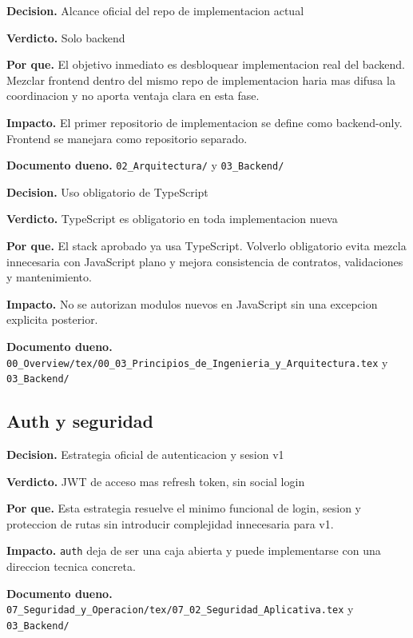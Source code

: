 \begin{docnote}
\textbf{Decision.} Alcance oficial del repo de implementacion actual

\textbf{Verdicto.} Solo backend

\textbf{Por que.} El objetivo inmediato es desbloquear implementacion real del backend. Mezclar frontend dentro del mismo repo de implementacion haria mas difusa la coordinacion y no aporta ventaja clara en esta fase.

\textbf{Impacto.} El primer repositorio de implementacion se define como backend-only. Frontend se manejara como repositorio separado.

\textbf{Documento dueno.} \texttt{02\_Arquitectura/} y \texttt{03\_Backend/}
\end{docnote}

\begin{docnote}
\textbf{Decision.} Uso obligatorio de TypeScript

\textbf{Verdicto.} TypeScript es obligatorio en toda implementacion nueva

\textbf{Por que.} El stack aprobado ya usa TypeScript. Volverlo obligatorio evita mezcla innecesaria con JavaScript plano y mejora consistencia de contratos, validaciones y mantenimiento.

\textbf{Impacto.} No se autorizan modulos nuevos en JavaScript sin una excepcion explicita posterior.

\textbf{Documento dueno.} \texttt{00\_Overview/tex/00\_03\_Principios\_de\_Ingenieria\_y\_Arquitectura.tex} y \texttt{03\_Backend/}
\end{docnote}

\subsection{Auth y seguridad}

\begin{docnote}
\textbf{Decision.} Estrategia oficial de autenticacion y sesion v1

\textbf{Verdicto.} JWT de acceso mas refresh token, sin social login

\textbf{Por que.} Esta estrategia resuelve el minimo funcional de login, sesion y proteccion de rutas sin introducir complejidad innecesaria para v1.

\textbf{Impacto.} \texttt{auth} deja de ser una caja abierta y puede implementarse con una direccion tecnica concreta.

\textbf{Documento dueno.} \texttt{07\_Seguridad\_y\_Operacion/tex/07\_02\_Seguridad\_Aplicativa.tex} y \texttt{03\_Backend/}
\end{docnote}

